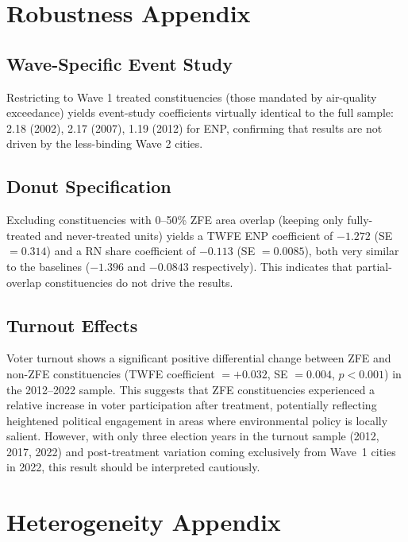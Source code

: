\documentclass[12pt]{article}
\begin{document}
\section{Robustness Appendix}
\label{app:robustness}

\subsection{Wave-Specific Event Study}

Restricting to Wave 1 treated constituencies (those mandated by air-quality exceedance) yields event-study coefficients virtually identical to the full sample: 2.18 (2002), 2.17 (2007), 1.19 (2012) for ENP, confirming that results are not driven by the less-binding Wave 2 cities.

\subsection{Donut Specification}

Excluding constituencies with 0--50\% ZFE area overlap (keeping only fully-treated and never-treated units) yields a TWFE ENP coefficient of $-1.272$ (SE $= 0.314$) and a RN share coefficient of $-0.113$ (SE $= 0.0085$), both very similar to the baselines ($-1.396$ and $-0.0843$ respectively). This indicates that partial-overlap constituencies do not drive the results.

\subsection{Turnout Effects}

Voter turnout shows a significant positive differential change between ZFE and non-ZFE constituencies (TWFE coefficient $= +0.032$, SE $= 0.004$, $p < 0.001$) in the 2012--2022 sample. This suggests that ZFE constituencies experienced a relative increase in voter participation after treatment, potentially reflecting heightened political engagement in areas where environmental policy is locally salient. However, with only three election years in the turnout sample (2012, 2017, 2022) and post-treatment variation coming exclusively from Wave~1 cities in 2022, this result should be interpreted cautiously.


\section{Heterogeneity Appendix}
\label{app:heterogeneity}
\end{document}
